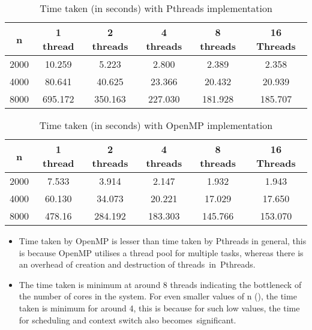 \documentclass{article}
\begin{document}
\begin{table}[!htb]
	\centering
	\begin{tabular}{cccccc}
		\hline
		\multicolumn{1}{|c|}{n} & \multicolumn{1}{c|}{1 thread} & \multicolumn{1}{c|}{2 threads} & \multicolumn{1}{c|}{4 threads} & \multicolumn{1}{c|}{8 threads} & \multicolumn{1}{c|}{16 Threads} \\ \hline
		2000                    & 10.259                        & 5.223                          & 2.800                          & 2.389                          & 2.358                           \\
		4000                    & 80.641                        & 40.625                         & 23.366                         & 20.432                         & 20.939                          \\
		8000                    & 695.172                       & 350.163                        & 227.030                        & 181.928                        & 185.707                        
	\end{tabular}
	\caption{Time taken (in seconds) with Pthreads implementation}
	\label{pthreads_time_taken}
\end{table}

\begin{table}[!htb]
	\centering
	\begin{tabular}{cccccc}
		\hline
		\multicolumn{1}{|c|}{n} & \multicolumn{1}{c|}{1 thread} & \multicolumn{1}{c|}{2 threads} & \multicolumn{1}{c|}{4 threads} & \multicolumn{1}{c|}{8 threads} & \multicolumn{1}{c|}{16 Threads} \\ \hline
		2000                    & 7.533                         & 3.914                          & 2.147                          & 1.932                          & 1.943                           \\
		4000                    & 60.130                        & 34.073                         & 20.221                         & 17.029                         & 17.650                          \\
		8000                    & 478.16                        & 284.192                        & 183.303                        & 145.766                        & 153.070                        
	\end{tabular}
	\caption{Time taken (in seconds) with OpenMP implementation}
	\label{omp_time_taken}
\end{table}

\begin{itemize}
	\item Time taken by OpenMP is lesser than time taken by Pthreads in general, this is because OpenMP utilises a thread pool for multiple tasks, whereas there is an overhead of creation and destruction of threads in Pthreads.
	\item The time taken is minimum at around 8 threads indicating the bottleneck of the number of cores in the system. For even smaller values of n (), the time taken is minimum for around 4, this is because for such low values, the time for scheduling and context switch also becomes significant.
\end{itemize}
\end{document}
